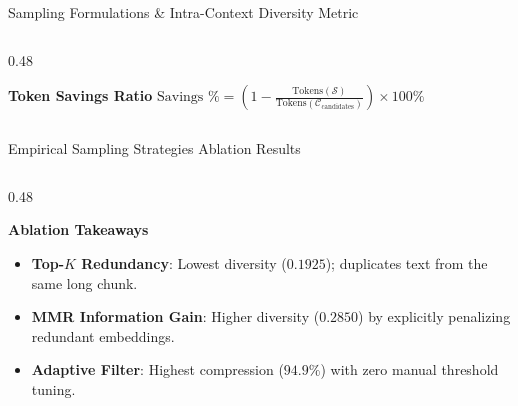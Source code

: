 \documentclass[10pt,aspectratio=169]{beamer}
\begin{document}
\begin{frame}{Sampling Formulations \& Intra-Context Diversity Metric}
\begin{columns}[onlytextwidth,T]
\begin{column}{0.48\textwidth}
            \vspace{0.1cm}
            \begin{exampleblock}{\textbf{Token Savings Ratio}}
                \centering
                \scriptsize
                $\text{Savings \%} = \left( 1 - \frac{\text{Tokens}(\mathcal{S})}{\text{Tokens}(\mathcal{C}_{\text{candidates}})} \right) \times 100\%$
            \end{exampleblock}
        \end{column}
    \end{columns}
\end{frame}

\begin{frame}{Empirical Sampling Strategies Ablation Results}
    \centering
    
    \vspace{0.2cm}
    \begin{columns}[onlytextwidth,T]
        \begin{column}{0.48\textwidth}
            \begin{block}{\textbf{Ablation Takeaways}}
                \scriptsize
                \begin{itemize}\setlength\itemsep{1.5pt}
                    \item \textbf{Top-$K$ Redundancy}: Lowest diversity ($0.1925$); duplicates text from the same long chunk.
                    \item \textbf{MMR Information Gain}: Higher diversity ($0.2850$) by explicitly penalizing redundant embeddings.
                    \item \textbf{Adaptive Filter}: Highest compression ($94.9\%$) with zero manual threshold tuning.
                \end{itemize}
            \end{block}
        \end{column}
        

\end{columns}
\end{frame}
\end{document}
